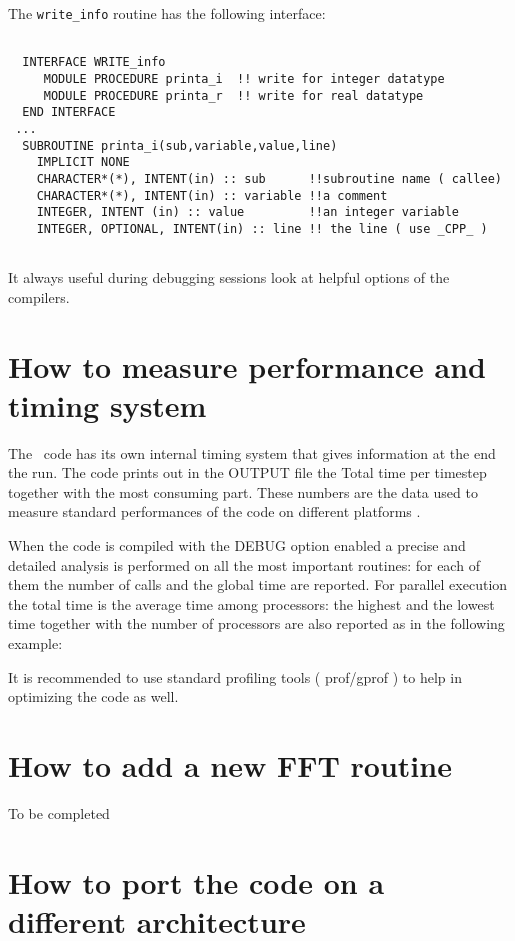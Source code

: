 The \verb=write_info= routine has the following interface:
\begin{verbatim}

  INTERFACE WRITE_info
     MODULE PROCEDURE printa_i  !! write for integer datatype
     MODULE PROCEDURE printa_r  !! write for real datatype
  END INTERFACE
 ...
  SUBROUTINE printa_i(sub,variable,value,line)
    IMPLICIT NONE
    CHARACTER*(*), INTENT(in) :: sub      !!subroutine name ( callee)
    CHARACTER*(*), INTENT(in) :: variable !!a comment
    INTEGER, INTENT (in) :: value         !!an integer variable
    INTEGER, OPTIONAL, INTENT(in) :: line !! the line ( use _CPP_ )
      
\end{verbatim} 

It always useful during debugging sessions look at helpful options of the
compilers.


\section{How to measure performance and timing system }

The \PR\  code  has its own internal timing system that gives information
at the end the run. The code prints out in the OUTPUT file the Total time
per timestep together with the most consuming part.
These numbers are the data used to measure standard performances of the
code on different platforms \cite{performance}.

When the code is compiled with the DEBUG option enabled a precise and
detailed analysis is performed on all the most important routines: for each
of them the number of calls and the global time are reported. For parallel
execution the total time is the average time among processors: the highest
and the lowest time together with the number of processors are also
reported as in the following example:

It is recommended to use standard profiling tools ( prof/gprof ) to help
in optimizing the code as well. 


\section { How to add a new FFT routine} 
To be completed 

\section { How to port the code on a different architecture}

